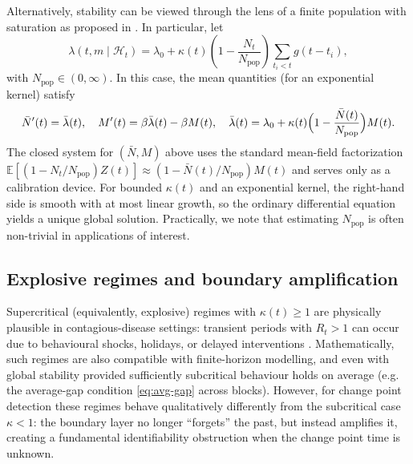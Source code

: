\documentclass{article}
\theoremstyle{plain}
\theoremstyle{definition}
\newcommand{\1}{\mathbf{1}}
\begin{document}
    Alternatively, stability can be viewed through the lens of a finite population with saturation as proposed in \cite{rizoiu2018sir}. In particular, let
    \[
    \lambda(t,m\mid\mathcal H_t)=\lambda_0 
    +\kappa(t)\left(1-\frac{N_t}{N_{\mathrm{pop}}}\right)\sum_{t_i<t} g(t-t_i),
    \]
    with $N_{\mathrm{pop}}\in(0,\infty)$. In this case, the mean quantities (for an exponential kernel) satisfy
    \[
    \bar N'(t)=\bar\lambda(t),\quad
    M'(t)=\beta\bar\lambda(t)-\beta M(t),\quad
    \bar\lambda(t)=\lambda_0+\kappa(t)\Bigl(1-\frac{\bar N(t)}{N_{\mathrm{pop}}}\Bigr)M(t).
    \]
    The closed system for $(\bar N,M)$ above uses the standard mean-field factorization 
    $\mathbb E[(1-N_t/N_{\mathrm{pop}})Z(t)]\approx (1-\bar N(t)/N_{\mathrm{pop}})M(t)$ and serves only as a calibration device. 
    For bounded $\kappa(t)$ and an exponential kernel, the right-hand side is smooth with at most linear growth, so the ordinary differential equation yields a unique global solution. Practically, we note that estimating $N_{\mathrm{pop}}$ is often non-trivial in applications of interest.

    \subsection{Explosive regimes and boundary amplification}
    \label{subsec:explosive}
    
    Supercritical (equivalently, explosive) regimes with \(\kappa(t)\ge 1\) are physically plausible in contagious-disease settings: transient periods with \(R_t>1\) can occur due to behavioural shocks, holidays, or delayed interventions \cite{you2020estimation}. Mathematically, such regimes are also compatible with finite-horizon modelling, and even with global stability provided sufficiently subcritical behaviour holds on average (e.g. the average-gap condition \eqref{eq:avg-gap} across blocks). However, for change point detection these regimes behave qualitatively differently from the subcritical case \(\kappa<1\): the boundary layer no longer ``forgets'' the past, but instead amplifies it, creating a fundamental identifiability obstruction when the change point time is unknown.
    
\end{document}
